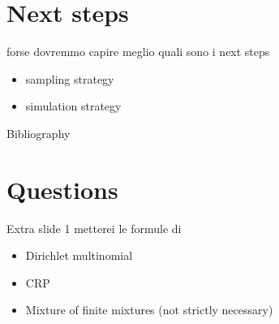 \section{Next steps}
\begin{frame}

forse dovremmo capire meglio quali sono i next steps

\begin{itemize}
    \item sampling strategy
    \item simulation strategy
\end{itemize}



\centering \Huge 
\end{frame}




\begin{frame}{Bibliography}
    \nocite{bensonAdaptiveMCMCMultiple2018}
    \nocite{martinezNonparametricChangePoint2014}
    \renewcommand*{\bibfont}{\tiny}
    \printbibliography
\end{frame}

\section*{Questions}


\begin{frame}{Extra slide 1}
metterei le formule di 
\begin{itemize}
    \item Dirichlet multinomial
    \item CRP
    \item Mixture of finite mixtures (not strictly necessary)

    

\end{itemize} 
\end{frame}






